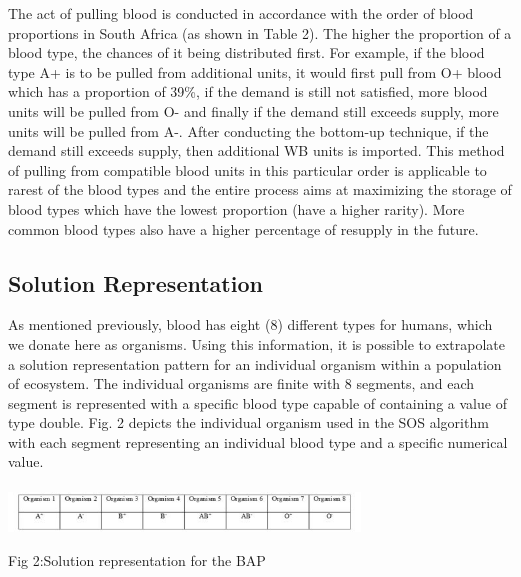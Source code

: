 \documentclass{article}
\begin{document}
The act of pulling blood is conducted in accordance with the order of blood proportions in South Africa (as shown in Table 2). The higher the proportion of a blood type, the chances of it being distributed first. For example, if the blood type A+ is to be pulled from additional units, it would first pull from O+ blood which has a proportion of 39\%, if the demand is still not satisfied, more blood units will be pulled from O- and finally if the demand still exceeds supply, more units will be pulled from A-. After conducting the bottom-up technique, if the demand still exceeds supply, then additional WB units is imported. This method of pulling from compatible blood units in this particular order is applicable to rarest of the blood types and the entire process aims at maximizing the storage of blood types which have the lowest proportion (have a higher rarity). More common blood types also have a higher percentage of resupply in the future.\\
\subsection{Solution Representation}
As mentioned previously, blood has eight (8) different types for humans, which we donate here as organisms. Using this information, it is possible to extrapolate a solution representation pattern for an individual organism within a population of ecosystem. The individual organisms are finite with 8 segments, and each segment is represented with a specific blood type capable of containing a value of type double. Fig. 2 depicts the individual organism used in the SOS algorithm with each segment representing an individual blood type and a specific numerical value.\\
\\
\includegraphics[width=0.7\textwidth, center]{Images/Solution.JPG}
\begin {center}
Fig 2:Solution representation for the BAP
\end {center}
\end{document}
